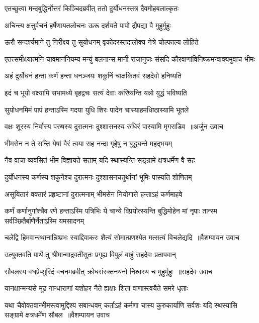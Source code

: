 \twolineshloka
{एतच्छुत्वा मन्दबुद्धिर्नोत्तरं किञ्चिदब्रवीत्}
{ततो दुर्योधनस्तत्र दैवमोहबलात्कृतः}


\twolineshloka
{अचिन्त्य क्षत्तुर्वचनं हर्षेणायतलोचनः}
{ऊरू दर्शयते पापो द्रौपद्या वै मुहुर्मुहुः}


\twolineshloka
{ऊरौ सन्दर्श्यमाने तु निरीक्ष्य तु सुयोधनम्}
{वृकोदरस्तदालोक्य नेत्रे चोल्फाल्य लोहिते}


\twolineshloka
{एतत्समीक्ष्यात्मनि चावमानंनियम्य मन्युं बलनान्स मानी}
{राजानुजः संसदि कौरवाणांविनिष्क्रमन्वाक्यमुवाच भीमः}


\twolineshloka
{अहं दुर्योधनं हन्ता कर्णं हन्ता धनञ्जयः}
{शकुनिं चाक्षकितवं सहदेवो हनिष्यति}


\twolineshloka
{इदं च भूयो वक्ष्यामि सभामध्ये बृहद्वचः}
{सत्यं देवाः करिष्यन्ति यन्नो युद्धं भविष्यति}


\twolineshloka
{सुयोधनमिमं पापं हन्ताऽस्मि गदया युधि}
{शिरः पादेन चास्याहमधिष्ठास्यामि भूतले}


\twolineshloka
{वक्षः शूरस्य निर्वास्य परुषस्य दुरात्मनः}
{दुश्शासनस्य रुधिरं पास्यामि मृगराडिव ॥अर्जुन उवाच}


\twolineshloka
{भीमसेन न ते सन्ति येषां वैरं त्वया सह}
{नन्दा गृहेषु न बुद्ध्यन्ते महद्भयम्}


\twolineshloka
{नैव वाचा व्यवसितं भीम विज्ञायते सताम्}
{यदि स्थास्यन्ति सङ्ग्रामे क्षत्रधर्मेण वै सह}


\twolineshloka
{दुर्योधनस्य कर्णस्य शकुनेश्च दुरात्मनः}
{दुश्शासनचतुर्थानां भूमिः पास्यति शोणितम्}


\twolineshloka
{असूयितारं वक्तारं प्रहृष्टानां दुरात्मनाम्}
{भीमसेन नियोगात्ते हन्ताऽहं कर्णमाहवे}


\threelineshloka
{कर्णं कर्णानुगांश्चैव रणे हन्ताऽस्मि पत्रिभिः}
{ये चान्ये विप्रयोत्स्यन्ति बुद्धिमोहेन मां नृपाः}
{तान्स्म सर्वञ्छितैर्बाणैर्नेताऽस्मि यमसादनम्}


\twolineshloka
{चलेद्वि हिमवान्स्थानान्निष्प्रभः स्याद्दिवाकरः}
{शैत्यं सोमात्प्रणश्येत मत्सत्यं विचलेद्यदि ॥वैशम्पायन उवाच}


\twolineshloka
{उत्युक्तवति पार्थे तु श्रीमान्माद्रवतीसुतः}
{प्रगृह्य विपुलं बाहुं सहदेवः प्रतापवान्}


\twolineshloka
{सौबलस्य वधप्रेप्सुरिदं वचनमब्रवीत्}
{क्रोधसंरक्तनयनो निश्वस्य च मुहुर्मुहुः ॥सहदेव उवाच}


\twolineshloka
{यानक्षान्मन्यसे मूढ गान्धाराणां यशोहर}
{नैते ह्यक्षाः शिता वाणास्त्वयैते समरे धृताः}


\threelineshloka
{यथा चैवोक्तवान्भीमस्त्वामुद्दिश्य सबान्धवम्}
{कर्ताऽहं कर्मणा चास्य कुरुकार्याणि सर्वशः}
{यदि स्थस्यासि सङ्ग्रामे क्षत्रधर्मेण सौबल ॥वैशम्पायन उवाच}


